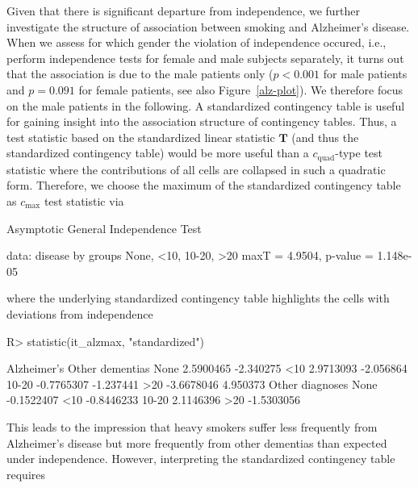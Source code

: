 \documentclass{article}
\newcommand{\T}{\mathbf{T}}
\newenvironment{Schunk}{}{}
\begin{document}
Given that there is significant departure from independence, we further
investigate the structure of association between smoking and Alzheimer's
disease. When we assess for which gender the violation of independence  
occured, i.e., perform independence tests for female and male
subjects separately, 
it turns out that the association is due to the male patients only
($p < 0.001$ for male patients and $p = 0.091$
for female patients, see also Figure~\ref{alz-plot}). 
We therefore focus on the male patients in the following.
A standardized contingency table is useful for gaining insight into the 
association structure of contingency tables. 
Thus, a test statistic based on the standardized linear statistic 
$\T$ (and thus the standardized contingency table) would be more useful than a
$c_\text{quad}$-type test statistic where the contributions of all cells are 
collapsed in such a quadratic form. Therefore, we choose the 
maximum of the standardized contingency table as $c_\text{max}$ test statistic via
\begin{Schunk}
\begin{Soutput}
	Asymptotic General Independence Test

data:  disease by
	 groups None, <10, 10-20, >20 
maxT = 4.9504, p-value = 1.148e-05
\end{Soutput}
\end{Schunk}
where the underlying standardized contingency table highlights the cells with
deviations from independence
\begin{Schunk}
\begin{Sinput}
R> statistic(it_alzmax, "standardized")
\end{Sinput}
\begin{Soutput}
      Alzheimer's Other dementias
None    2.5900465       -2.340275
<10     2.9713093       -2.056864
10-20  -0.7765307       -1.237441
>20    -3.6678046        4.950373
      Other diagnoses
None       -0.1522407
<10        -0.8446233
10-20       2.1146396
>20        -1.5303056
\end{Soutput}
\end{Schunk}
This leads to the impression that heavy smokers suffer less frequently
from Alzheimer's disease but more frequently from other dementias
than expected under independence.
However, interpreting the standardized contingency table requires
\end{document}
